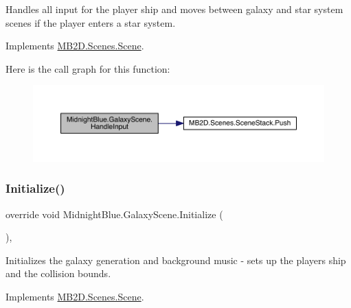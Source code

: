 Handles all input for the player ship and moves between galaxy and star system scenes if the player enters a star system. 



Implements \hyperlink{class_m_b2_d_1_1_scenes_1_1_scene_a476de5a885408d27ff151044d20738c8}{M\+B2\+D.\+Scenes.\+Scene}.

Here is the call graph for this function\+:\nopagebreak
\begin{figure}[H]
\begin{center}
\leavevmode
\includegraphics[width=350pt]{class_midnight_blue_1_1_galaxy_scene_afd7f8c9f6d0cf6ded10299d4b0015c29_cgraph}
\end{center}
\end{figure}
\hypertarget{class_midnight_blue_1_1_galaxy_scene_a97d97e56a73d9a4b7caf6dd6ce86647e}{}\label{class_midnight_blue_1_1_galaxy_scene_a97d97e56a73d9a4b7caf6dd6ce86647e} 
\subsubsection{\texorpdfstring{Initialize()}{Initialize()}}
{\footnotesize\ttfamily override void Midnight\+Blue.\+Galaxy\+Scene.\+Initialize (\begin{DoxyParamCaption}{ }\end{DoxyParamCaption})\hspace{0.3cm}{\ttfamily [inline]}, {\ttfamily [virtual]}}



Initializes the galaxy generation and background music -\/ sets up the players ship and the collision bounds. 



Implements \hyperlink{class_m_b2_d_1_1_scenes_1_1_scene_a081b4f8866936b495bdce388a7c96c25}{M\+B2\+D.\+Scenes.\+Scene}.

\hypertarget{class_midnight_blue_1_1_galaxy_scene_aeb44afaeda2cccd225e64908bb76bee4}{}\label{class_midnight_blue_1_1_galaxy_scene_aeb44afaeda2cccd225e64908bb76bee4} 
